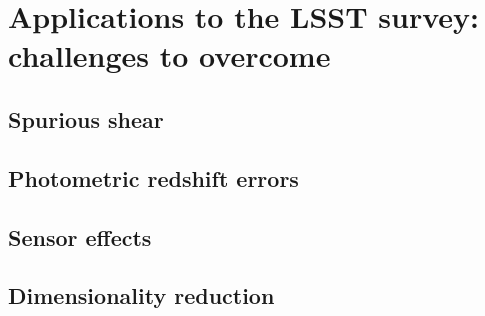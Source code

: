 
\chapter{Applications to the LSST survey: challenges to overcome}
\lhead[\fancyplain{}{\thepage}]{\fancyplain{}{\rightmark}}
 \thispagestyle{plain}
\setlength{\parindent}{10mm}


\section{Spurious shear}
\section{Photometric redshift errors}
\section{Sensor effects}
\section{Dimensionality reduction}

%